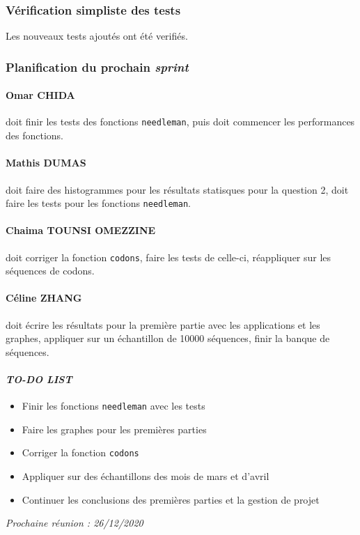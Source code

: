 \subsubsection*{Vérification simpliste des tests}
Les nouveaux tests ajoutés ont été verifiés.

\subsubsection*{Planification du prochain \textsl{sprint}}
\paragraph*{Omar CHIDA} doit finir les tests des fonctions \texttt{needleman}, puis doit commencer les performances des fonctions.

\paragraph*{Mathis DUMAS} doit faire des histogrammes pour les résultats statisques pour la question 2, doit faire les tests pour les fonctions \texttt{needleman}.

\paragraph*{Chaima TOUNSI OMEZZINE} doit corriger la fonction \texttt{codons}, faire les tests de celle-ci, réappliquer sur les séquences de codons.

\paragraph*{Céline ZHANG} doit écrire les résultats pour la première partie avec les applications et les graphes, appliquer sur un échantillon de 10000 séquences, finir la banque de séquences.

\paragraph{\emph{TO-DO LIST}}
\begin{itemize}
    \item Finir les fonctions \texttt{needleman} avec les tests
    \item Faire les graphes pour les premières parties
    \item Corriger la fonction \texttt{codons}
    \item Appliquer sur des échantillons des mois de mars et d'avril
    \item Continuer les conclusions des premières parties et la gestion de projet
\end{itemize}

\emph{Prochaine réunion : 26/12/2020}\\

% 